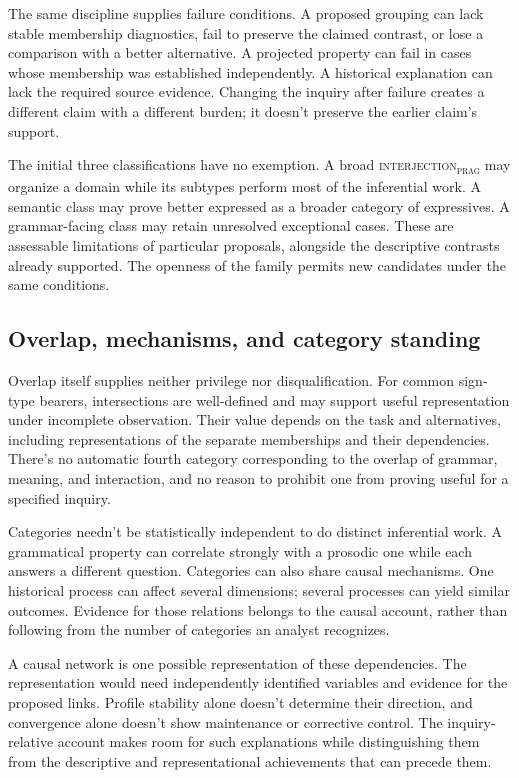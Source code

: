 \documentclass[12pt]{article}
\newcommand{\intj}[1]{\textsc{interjection\textsubscript{#1}}}
\begin{document}
The same discipline supplies failure conditions. A proposed grouping
can lack stable membership diagnostics, fail to preserve the claimed
contrast, or lose a comparison with a better alternative. A projected
property can fail in cases whose membership was established independently.
A historical explanation can lack the required source evidence.
Changing the inquiry after failure creates a different claim with
a different burden; it doesn't preserve the earlier claim's support.

The initial three classifications have no exemption. A broad
\intj{prag} may organize a domain while its subtypes perform most
of the inferential work. A semantic class may prove better expressed
as a broader category of expressives. A grammar-facing class may
retain unresolved exceptional cases. These are assessable limitations
of particular proposals, alongside the descriptive contrasts already
supported. The openness of the family permits new candidates under
the same conditions.

\subsection{Overlap, mechanisms, and category standing}

Overlap itself supplies neither privilege nor disqualification.
For common sign-type bearers, intersections are well-defined and
may support useful representation under incomplete observation.
Their value depends on the task and alternatives, including
representations of the separate memberships and their dependencies.
There's no automatic fourth category corresponding to the overlap
of grammar, meaning, and interaction, and no reason to prohibit
one from proving useful for a specified inquiry.

Categories needn't be statistically independent to do distinct
inferential work. A grammatical property can correlate strongly
with a prosodic one while each answers a different question.
Categories can also share causal mechanisms. One
historical process can affect several dimensions; several processes
can yield similar outcomes. Evidence for those relations belongs
to the causal account, rather than following from the number
of categories an analyst recognizes.

A causal network is one possible representation of these dependencies.
The representation would need independently identified variables and evidence
for the proposed links. Profile stability alone doesn't determine
their direction, and convergence alone doesn't show maintenance
or corrective control. The inquiry-relative account makes room
for such explanations while distinguishing them from the descriptive
and representational achievements that can precede them.
\end{document}
